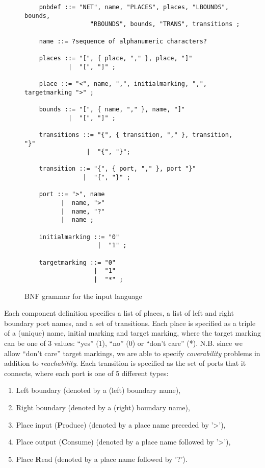 \begin{figure}[ht]
\begin{lstlisting}
    pnbdef ::= "NET", name, "PLACES", places, "LBOUNDS", bounds,
                  "RBOUNDS", bounds, "TRANS", transitions ;

    name ::= ?sequence of alphanumeric characters?

    places ::= "[", { place, "," }, place, "]"
            |  "[", "]" ;

    place ::= "<", name, ",", initialmarking, ",", targetmarking ">" ;

    bounds ::= "[", { name, "," }, name, "]"
            |  "[", "]" ;

    transitions ::= "{", { transition, "," }, transition, "}"
                 |  "{", "}";

    transition ::= "{", { port, "," }, port "}"
                |  "{", "}" ;

    port ::= ">", name
          |  name, ">"
          |  name, "?"
          |  name ;

    initialmarking ::= "0"
                    |  "1" ;

    targetmarking ::= "0"
                   |  "1"
                   |  "*" ;

\end{lstlisting}
\caption{BNF grammar for the input language}
\label{fig:literalSpecGrammar}
\end{figure}

Each component definition specifies a list of places, a list of left and right
boundary port names, and a set of transitions. Each place is specified as a
triple of a (unique) name, initial marking and target marking, where the target
marking can be one of 3 values: ``yes'' (1), ``no'' (0) or ``don't care'' (*).
N.B.  since we allow ``don't care'' target markings, we are able to specify
\emph{coverability} problems in addition to \emph{reachability}.  Each
transition is specified as the set of ports that it connects, where each port
is one of 5 different types:
\begin{enumerate}
    \item Left boundary (denoted by a (left) boundary name),
    \item Right boundary (denoted by a (right) boundary name),
    \item Place input ({\bf P}roduce)
        (denoted by a place name preceded by '>'),
    \item Place output ({\bf C}onsume)
        (denoted by a place name followed by '>'),
    \item Place {\bf R}ead
        (denoted by a place name followed by '?').
\end{enumerate}

